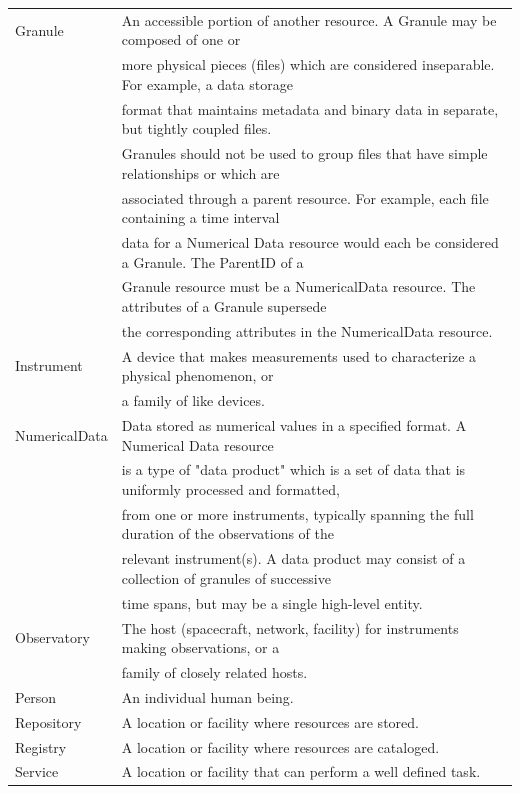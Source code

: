 \begin{table}[H]
\begin{center}
\begin{tabular}{ll}
Granule  & An accessible portion of another resource. A Granule may be composed of one or \\
 & more physical pieces (files) which are considered inseparable. For example, a data storage \\
 & format that maintains metadata and binary data in separate, but tightly coupled files. \\
 & Granules should not be used to group files that have simple relationships or which are \\
 & associated through a parent resource. For example, each file containing a time interval \\
 & data for a Numerical Data resource would each be considered a Granule. The ParentID of a \\
 & Granule resource must be a NumericalData resource. The attributes of a Granule supersede \\
 & the corresponding attributes in the NumericalData resource.\\
Instrument & A device that makes measurements used to characterize a physical phenomenon, or \\
 & a family of like devices.\\
NumericalData & Data stored as numerical values in a specified format. A Numerical Data resource \\
 & is a type of "data product" which is a set of data that is uniformly processed and formatted, \\
 & from one or more instruments, typically spanning the full duration of the observations of the \\
 & relevant instrument(s). A data product may consist of a collection of granules of successive \\
 & time spans, but may be a single high-level entity.\\ \hline
Observatory & The host (spacecraft, network, facility) for instruments making observations, or a \\
 & family of closely related hosts.\\
Person & An individual human being. \\ \hline
Repository & A location or facility where resources are stored.\\
Registry & A location or facility where resources are cataloged.\\ 
Service & A location or facility that can perform a well defined task.\\ \hline
\end{tabular}
\end{center}
\end{table}


